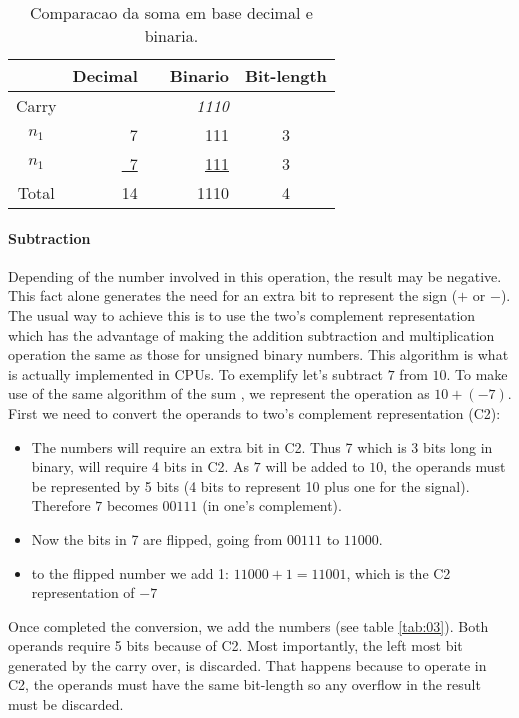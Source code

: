 \documentclass[12pt]{article}
\begin{document}
\begin{table}[ht]
	\centering
    \caption{Comparacao da soma em base decimal e binaria.}
    \begin{tabular}{crrrc}
    \hline
    	  & Decimal & & Binario & Bit-length \\
    \hline      
    Carry & 	& & \textit{1110} & \\
    $n_1$ & 7   & & 111 & 3 \\
    $n_1$ & \underline{~7}	& & \underline{111} & 3 \\
    Total & 14	& & 1110 & 4 \\
    \hline
	\end{tabular}
    \label{tab:02}
\end{table}

\paragraph{Subtraction}
Depending of the number involved in this operation, the result may be negative.
This fact alone generates the need for an extra bit to represent the sign ($+$
or
$-$). The usual way to achieve this is to use the  two's complement
\cite{flores1963logic} representation which has the advantage of making the
addition subtraction and multiplication operation the same as those for unsigned
binary numbers. This algorithm is what is actually implemented in CPUs. To
exemplify let's subtract $7$ from $10$. To make use of the
same algorithm of the sum , we represent the operation as $10+(-7)$. First we
need to convert the operands to two's complement representation (C2):

\begin{itemize}
    \item The numbers will require an extra bit in C2. Thus 7 which is 3
bits long in binary, will require 4 bits in C2. As $7$ will be added to $10$,
the operands must be represented by 5 bits (4 bits to represent 10 plus one for
the signal). Therefore $7$ becomes $00111$ (in one's complement).

    \item Now the bits in 7 are flipped, going from $00111$ to $11000$.

    \item to the flipped number we add 1: $11000+1=11001$, which is the C2
representation of $-7$
\end{itemize}

Once completed the conversion, we add the numbers (see table  \ref{tab:03}).
Both operands require 5 bits because of C2. Most importantly, the left most
bit generated by the carry over, is discarded. That happens because to operate
in C2, the operands must have the same bit-length so any overflow in the result
must be discarded.
\end{document}
